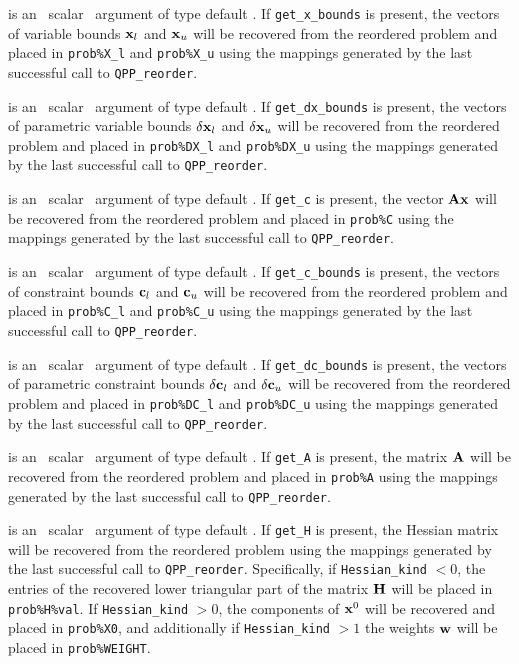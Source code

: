\documentclass{galahad}
\newcommand{\packagename}{QPP}
\begin{document}
\begin{description}
is an \optional\ scalar \intentin\ argument of type default \logical.
If {\tt get\_x\_bounds} is present,
the vectors of variable bounds ${\mathbf{x}}_l$ and ${\mathbf{x}}_u$
will be recovered from  the reordered problem and placed in {\tt prob\%X\_l}
and {\tt prob\%X\_u} using the mappings generated by the last successful
call to {\tt \packagename\_reorder}.

is an \optional\ scalar \intentin\ argument of type default \logical.
If {\tt get\_dx\_bounds} is present,
the vectors of parametric variable bounds $\delta {\mathbf{x}}_l$ and
$\delta {\mathbf{x}}_u$
will be recovered from  the reordered problem and placed in {\tt prob\%DX\_l}
and {\tt prob\%DX\_u} using the mappings generated by the last successful
call to {\tt \packagename\_reorder}.

is an \optional\ scalar \intentin\ argument of type default \logical.
If {\tt get\_c} is present, the vector ${\mathbf{A}} {\mathbf{x}}$
will be recovered from  the reordered problem and placed in {\tt prob\%C}
using the mappings generated by the last successful call to
{\tt \packagename\_reorder}.

is an \optional\ scalar \intentin\ argument of type default \logical.
If {\tt get\_c\_bounds} is present,
the vectors of constraint bounds ${\mathbf{c}}_l$ and
${\mathbf{c}}_u$
will be recovered from  the reordered problem and placed in {\tt prob\%C\_l}
and {\tt prob\%C\_u} using the mappings generated by the last successful
call to {\tt \packagename\_reorder}.

is an \optional\ scalar \intentin\ argument of type default \logical.
If {\tt get\_dc\_bounds} is present,
the vectors of parametric constraint bounds $\delta {\mathbf{c}}_l$ and $\delta {\mathbf{c}}_u$
will be recovered from  the reordered problem and placed in {\tt prob\%DC\_l}
and {\tt prob\%DC\_u} using the mappings generated by the last successful
call to {\tt \packagename\_reorder}.

is an \optional\ scalar \intentin\ argument of type default \logical.
If {\tt get\_A} is present, the matrix ${\mathbf{A}}$
will be recovered from the reordered problem and placed in {\tt prob\%A}
using the mappings generated by the last successful call to
{\tt \packagename\_reorder}.

is an \optional\ scalar \intentin\ argument of type default \logical.
If {\tt get\_H} is present, the Hessian matrix will be recovered  from the
reordered problem using the mappings generated by the last successful call to
{\tt \packagename\_reorder}.
Specifically, if {\tt Hessian\_kind} $< 0$, the entries of the
recovered lower triangular part of the matrix ${\mathbf{H}}$ will be placed in
{\tt prob\%H\%val}. If {\tt Hessian\_kind} $> 0$, the
components of ${\mathbf{x}}^0$ will be recovered and placed in
{\tt prob\%X0}, and additionally if {\tt Hessian\_kind} $> 1$
the weights ${\mathbf{w}}$ will be placed in {\tt prob\%WEIGHT}.

\end{description}
\end{document}
